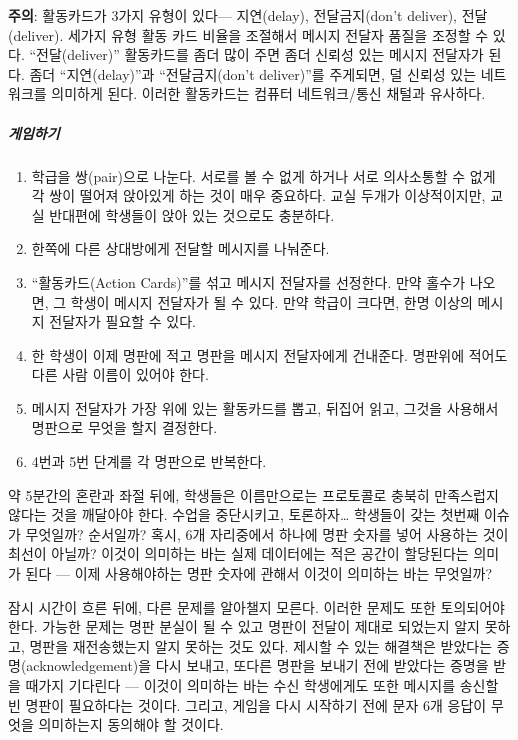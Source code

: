 \documentclass[]{article}
\begin{document}
\textbf{주의}: 활동카드가 3가지 유형이 있다--- 지연(delay),
전달금지(don't deliver), 전달(deliver). 세가지 유형 활동 카드 비율을
조절해서 메시지 전달자 품질을 조정할 수 있다. ``전달(deliver)''
활동카드를 좀더 많이 주면 좀더 신뢰성 있는 메시지 전달자가 된다. 좀더
``지연(delay)''과 ``전달금지(don't deliver)''를 주게되면, 덜 신뢰성 있는
네트워크를 의미하게 된다. 이러한 활동카드는 컴퓨터 네트워크/통신 채털과
유사하다.

\subparagraph{게임하기}\label{section-150}

\begin{enumerate}
\item
  학급을 쌍(pair)으로 나눈다. 서로를 볼 수 없게 하거나 서로 의사소통할
  수 없게 각 쌍이 떨어져 앉아있게 하는 것이 매우 중요하다. 교실 두개가
  이상적이지만, 교실 반대편에 학생들이 앉아 있는 것으로도 충분하다.
\item
  한쪽에 다른 상대방에게 전달할 메시지를 나눠준다.
\item
  ``활동카드(Action Cards)''를 섞고 메시지 전달자를 선정한다. 만약
  홀수가 나오면, 그 학생이 메시지 전달자가 될 수 있다. 만약 학급이
  크다면, 한명 이상의 메시지 전달자가 필요할 수 있다.
\item
  한 학생이 이제 명판에 적고 명판을 메시지 전달자에게 건내준다. 명판위에
  적어도 다른 사람 이름이 있어야 한다.
\item
  메시지 전달자가 가장 위에 있는 활동카드를 뽑고, 뒤집어 읽고, 그것을
  사용해서 명판으로 무엇을 할지 결정한다.
\item
  4번과 5번 단계를 각 명판으로 반복한다.
\end{enumerate}

약 5분간의 혼란과 좌절 뒤에, 학생들은 이름만으로는 프로토콜로 충북히
만족스럽지 않다는 것을 깨달아야 한다. 수업을 중단시키고,
토론하자\ldots{} 학생들이 갖는 첫번째 이슈가 무엇일까? 순서일까? 혹시,
6개 자리중에서 하나에 명판 숫자를 넣어 사용하는 것이 최선이 아닐까?
이것이 의미하는 바는 실제 데이터에는 적은 공간이 할당된다는 의미가 된다
--- 이제 사용해야하는 명판 숫자에 관해서 이것이 의미하는 바는 무엇일까?

잠시 시간이 흐른 뒤에, 다른 문제를 알아챌지 모른다. 이러한 문제도 또한
토의되어야 한다. 가능한 문제는 명판 분실이 될 수 있고 명판이 전달이
제대로 되었는지 알지 못하고, 명판을 재전송했는지 알지 못하는 것도 있다.
제시할 수 있는 해결책은 받았다는 증명(acknowledgement)을 다시 보내고,
또다른 명판을 보내기 전에 받았다는 증명을 받을 때가지 기다린다 ---
이것이 의미하는 바는 수신 학생에게도 또한 메시지를 송신할 빈 명판이
필요하다는 것이다. 그리고, 게임을 다시 시작하기 전에 문자 6개 응답이
무엇을 의미하는지 동의해야 할 것이다.
\end{document}
